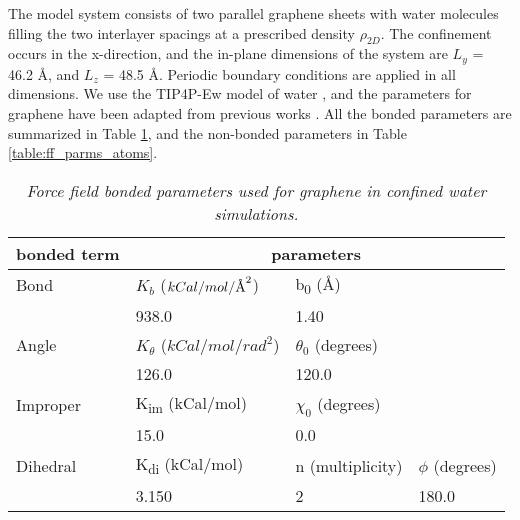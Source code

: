 \documentclass[journal=acsnano,manuscript=article]{achemso}
\newcommand{\angstrom}{\textup{\AA}}
\begin{document}
	The model system consists of two parallel graphene sheets with water molecules filling the two interlayer spacings at a prescribed density \(\rho_{2D}\). The confinement occurs in the x-direction, and the in-plane dimensions of the system are \(L_y\) = 46.2 \r A, and  \(L_z\) = 48.5 \r A. Periodic boundary conditions are applied in all dimensions. We use the TIP4P-Ew model of water \cite{Horn2004}, and the parameters for graphene have been adapted from previous works \cite{Hummer2001,Patra2009}. All the bonded parameters are summarized in Table \ref{table:ff_parms}, and the non-bonded parameters in Table \ref{table:ff_parms_atoms}. 
	
	\begin{table}[ht!]
		\caption{\textit{Force field bonded parameters used for graphene in confined water simulations.}}
		\label{table:ff_parms}
		\centering
		\begin{tabular}{  l |  l l l } \hline
			\textbf{bonded term}  &\multicolumn{3}{c}{\textbf{parameters}} \\ \hline
			Bond  & \(K_b\)  (\(kCal/mol/\angstrom^2\))      & b\textsubscript{0}  (\r A)  &  \\ %
			   & 938.0         & 1.40            &    \\   \hline
			Angle & \(K_{\theta}\)  (\(kCal/mol/rad^2\)) & \(\theta_0\) (degrees)   &          \\ 
			  & 126.0         & 120.0           &         \\ \hline
			Improper   & K\textsubscript{im} (kCal/mol)       & \(\chi_0\) (degrees)     &          \\ 
			 & 15.0          & 0.0             &          \\ \hline
			Dihedral      & K\textsubscript{di} (kCal/mol)       & n (multiplicity) & \(\phi\) (degrees)\\ 
			 & 3.150         & 2               & 180.0  \\  \hline
		\end{tabular}
	\end{table}
	
\end{document}
